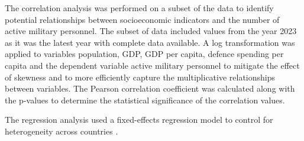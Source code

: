 The correlation analysis was performed on a subset of the data to identify potential 
relationships between socioeconomic indicators and the number of active military 
personnel. The subset of data included values from the year 2023 as it was the latest
year with complete data available. A log transformation was applied to variables 
population, GDP, GDP per capita, defence spending per capita and the dependent variable 
active military personnel to mitigate the effect of skewness and to more efficiently 
capture the multiplicative relationships between variables.
The Pearson correlation coefficient was calculated along with the p-values to 
determine the statistical significance of the correlation values.

The regression analysis used a fixed-effects regression model to control for heterogeneity
across countries \parencite{backstrom_are_2019}. 
